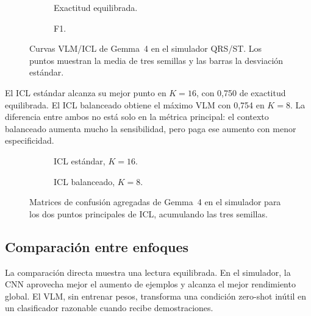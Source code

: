 \begin{figure}[H]
  \centering
  \begin{subfigure}{0.48\textwidth}
    \centering
    \caption{Exactitud equilibrada.}
  \end{subfigure}
  \hfill
  \begin{subfigure}{0.48\textwidth}
    \centering
    \caption{F1.}
  \end{subfigure}
  \caption{Curvas VLM/ICL de Gemma~4 en el simulador QRS/ST. Los puntos muestran la media de tres semillas y las barras la desviación estándar.}
  \label{fig:vlm_simulator_curves}
\end{figure}

El ICL estándar alcanza su mejor punto en \(K=16\), con 0,750 de exactitud equilibrada. El ICL balanceado obtiene el máximo VLM con 0,754 en \(K=8\). La diferencia entre ambos no está solo en la métrica principal: el contexto balanceado aumenta mucho la sensibilidad, pero paga ese aumento con menor especificidad.

\begin{figure}[H]
  \centering
  \begin{subfigure}{0.42\textwidth}
    \centering
    \caption{ICL estándar, \(K=16\).}
  \end{subfigure}
  \hfill
  \begin{subfigure}{0.42\textwidth}
    \centering
    \caption{ICL balanceado, \(K=8\).}
  \end{subfigure}
  \caption{Matrices de confusión agregadas de Gemma~4 en el simulador para los dos puntos principales de ICL, acumulando las tres semillas.}
  \label{fig:vlm_simulator_confusions}
\end{figure}

\subsection{Comparación entre enfoques}

La comparación directa muestra una lectura equilibrada. En el simulador, la CNN aprovecha mejor el aumento de ejemplos y alcanza el mejor rendimiento global. El VLM, sin entrenar pesos, transforma una condición zero-shot inútil en un clasificador razonable cuando recibe demostraciones.

